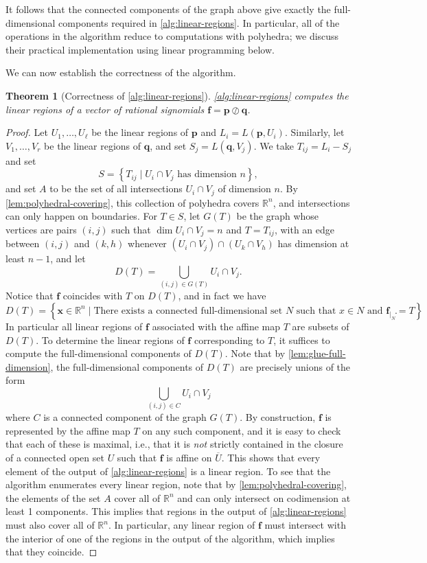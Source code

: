 \documentclass[10pt]{article}
\newtheorem{theorem}{Theorem}[]
\theoremstyle{definition}
\theoremstyle{remark}
\newcommand{\RR}{{\mathbb{R}}}
\renewcommand{\vec}[1]{\mathbf{#1}}
\def\vf{{\vec{f}}}
\def\vp{{\vec{p}}}
\def\vq{{\vec{q}}}
\begin{document}
It follows that the connected components of the graph above give exactly the full-dimensional components required in \cref{alg:linear-regions}. In particular, all of the operations in the algorithm reduce to computations with polyhedra; we discuss their
practical implementation using linear programming below.

We can now establish the correctness of the algorithm.

\begin{theorem}[Correctness of \cref{alg:linear-regions}] \label{thm:linear-region-algorithm}
    \cref{alg:linear-regions} computes the linear regions of a vector of rational signomials $\vf = \vp \oslash \vq$.
\end{theorem}

\begin{proof}
    Let $U_1, \dotsc, U_\ell$ be the linear regions of $\vp$ and $L_i = L(\vp, U_i)$. Similarly, let $V_1, \dotsc, V_r$ be the linear regions of $\vq$, and set $S_j = L(\vq, V_j)$.
    We take $T_{ij} = L_i - S_j$ and set
    $$
        S = \left\{ T_{ij} \mid U_i \cap V_j \text{ has dimension } n  \right\},
    $$
    and set $A$ to be the set of all intersections $U_i \cap V_j$ of dimension $n$.
    By \cref{lem:polyhedral-covering}, this collection of polyhedra covers $\RR^n$, and intersections can only happen on boundaries.
    For $T \in S$, let $G(T)$ be the graph whose vertices are pairs $(i, j)$ such that $\dim U_i \cap V_j = n$ and $T = T_{ij}$, with an edge between $(i, j)$ and $(k, h)$ whenever $(U_i \cap V_j) \cap (U_k \cap V_h)$ has dimension at least $n-1$, and let
    $$
        D(T) = \bigcup_{(i, j) \in G(T)} U_i \cap V_j.
    $$
    Notice that $\vf$ coincides with $T$ on $D(T)$, and in fact we have
    $$
        D(T) = \left\{ \mathbf x \in \RR^n \mid \text{There exists a connected full-dimensional set } N \text{ such that } x \in N \text{ and } \vf_{\mid_N} = T\right\}.
    $$
    In particular all linear regions of $\vf$ associated with the affine map $T$ are subsets of $D(T)$. To determine the linear regions of $\vf$ corresponding to $T$, it suffices to compute the full-dimensional components of $D(T)$.
    Note that by \cref{lem:glue-full-dimension}, the full-dimensional components of $D(T)$ are precisely unions of the form
    $$
        \bigcup_{(i, j) \in C} U_i \cap V_j
    $$
    where $C$ is a connected component of the graph $G(T)$.
    By construction, $\vf$ is represented by the affine map $T$ on any such component, and it is easy to check that each of these is maximal, i.e., that it is \emph{not} strictly contained in the closure of a connected open set $U$ such that $\vf$ is affine on $\overline U$.
    This shows that every element of the output of \cref{alg:linear-regions} is a linear region. To see that the algorithm enumerates every linear region, note that by \cref{lem:polyhedral-covering}, the elements of the set $A$ cover all of $\RR^n$ and can only intersect on codimension at least 1 components. This implies that regions in the output of \cref{alg:linear-regions} must also cover all of $\RR^n$. In particular, any linear region of $\vf$ must intersect with the interior of one of the regions in the output of the algorithm, which implies that they coincide.
\end{proof}
\end{document}
